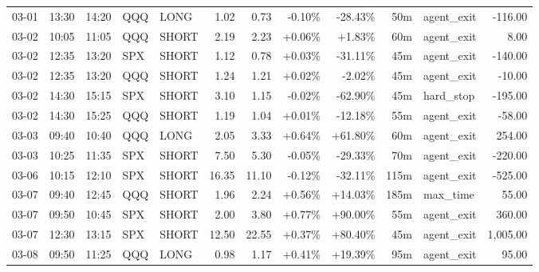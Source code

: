 \documentclass[11pt,a4paper,twoside]{article}
\begin{document}
\begin{center}
\begin{longtable}{>{\color{txtmain}}l l l l l r r r r r >{\color{txtmain}}l r}
03-01 & 13:30 & 14:20 & QQQ & LONG & 1.02 & 0.73 & \textcolor{lossred}{-0.10\%} & \textcolor{lossred}{-28.43\%} & 50m & agent\_exit & \textcolor{lossred}{-116.00} \\
03-02 & 10:05 & 11:05 & QQQ & SHORT & 2.19 & 2.23 & \textcolor{wingreen}{+0.06\%} & \textcolor{wingreen}{+1.83\%} & 60m & agent\_exit & \textcolor{wingreen}{8.00} \\
03-02 & 12:35 & 13:20 & SPX & SHORT & 1.12 & 0.78 & \textcolor{wingreen}{+0.03\%} & \textcolor{lossred}{-31.11\%} & 45m & agent\_exit & \textcolor{lossred}{-140.00} \\
03-02 & 12:35 & 13:20 & QQQ & SHORT & 1.24 & 1.21 & \textcolor{wingreen}{+0.02\%} & \textcolor{lossred}{-2.02\%} & 45m & agent\_exit & \textcolor{lossred}{-10.00} \\
03-02 & 14:30 & 15:15 & SPX & SHORT & 3.10 & 1.15 & \textcolor{lossred}{-0.02\%} & \textcolor{lossred}{-62.90\%} & 45m & hard\_stop & \textcolor{lossred}{-195.00} \\
03-02 & 14:30 & 15:25 & QQQ & SHORT & 1.19 & 1.04 & \textcolor{wingreen}{+0.01\%} & \textcolor{lossred}{-12.18\%} & 55m & agent\_exit & \textcolor{lossred}{-58.00} \\
03-03 & 09:40 & 10:40 & QQQ & LONG & 2.05 & 3.33 & \textcolor{wingreen}{+0.64\%} & \textcolor{wingreen}{+61.80\%} & 60m & agent\_exit & \textcolor{wingreen}{254.00} \\
03-03 & 10:25 & 11:35 & SPX & SHORT & 7.50 & 5.30 & \textcolor{lossred}{-0.05\%} & \textcolor{lossred}{-29.33\%} & 70m & agent\_exit & \textcolor{lossred}{-220.00} \\
03-06 & 10:15 & 12:10 & SPX & SHORT & 16.35 & 11.10 & \textcolor{lossred}{-0.12\%} & \textcolor{lossred}{-32.11\%} & 115m & agent\_exit & \textcolor{lossred}{-525.00} \\
03-07 & 09:40 & 12:45 & QQQ & SHORT & 1.96 & 2.24 & \textcolor{wingreen}{+0.56\%} & \textcolor{wingreen}{+14.03\%} & 185m & max\_time & \textcolor{wingreen}{55.00} \\
03-07 & 09:50 & 10:45 & SPX & SHORT & 2.00 & 3.80 & \textcolor{wingreen}{+0.77\%} & \textcolor{wingreen}{+90.00\%} & 55m & agent\_exit & \textcolor{wingreen}{360.00} \\
03-07 & 12:30 & 13:15 & SPX & SHORT & 12.50 & 22.55 & \textcolor{wingreen}{+0.37\%} & \textcolor{wingreen}{+80.40\%} & 45m & agent\_exit & \textcolor{wingreen}{1,005.00} \\
03-08 & 09:50 & 11:25 & QQQ & LONG & 0.98 & 1.17 & \textcolor{wingreen}{+0.41\%} & \textcolor{wingreen}{+19.39\%} & 95m & agent\_exit & \textcolor{wingreen}{95.00} \\

\end{longtable}
\end{center}
\end{document}
